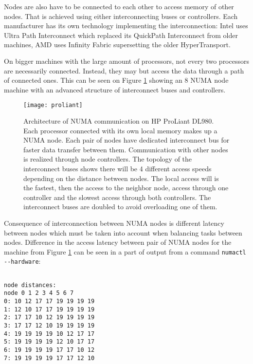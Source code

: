 Nodes are also have to be connected to each other to access memory of other
nodes. That is achieved using either interconnecting buses or controllers. Each
manufacturer has its own technology implementing the interconnection: Intel uses
Ultra Path Interconnect which replaced its QuickPath Interconnect from older
machines, AMD uses Infinity Fabric supersetting the older HyperTransport.

On bigger machines with the large amount of processors, not every two processors
are necessarily connected. Instead, they may but access the data through a path
of connected ones. This can be seen on Figure \ref{fig:proliant} showing an 8
NUMA node machine with an advanced structure of interconnect buses and
controllers.

\begin{figure}
  \centering
  \texttt{[image: proliant]}
  \caption{Architecture of NUMA communication on HP ProLiant DL980. Each
    processor connected with its own local memory makes up a NUMA node. Each
    pair of nodes have dedicated interconnect bus for faster data transfer
    between them. Communication with other nodes is realized through node
    controllers. The topology of the interconnect buses shows there will be 4
    different access speeds depending on the distance between nodes. The local
    access will is the fastest, then the access to the neighbor node, access
    through one controller and the slowest access through both controllers. The
    interconnect buses are doubled to avoid overloading one of them.}
  \label{fig:proliant}
\end{figure}

Consequence of interconnection between NUMA nodes is different latency between
nodes which must be taken into account when balancing tasks between nodes.
Difference in the access latency between pair of NUMA nodes for the machine from
Figure \ref{fig:proliant} can be seen in a part of output from a command
\verb|numactl --hardware|:

\begin{minipage}{\linewidth}
\begin{verbatim}

node distances:
node 0 1 2 3 4 5 6 7
0: 10 12 17 17 19 19 19 19
1: 12 10 17 17 19 19 19 19
2: 17 17 10 12 19 19 19 19
3: 17 17 12 10 19 19 19 19
4: 19 19 19 19 10 12 17 17
5: 19 19 19 19 12 10 17 17
6: 19 19 19 19 17 17 10 12
7: 19 19 19 19 17 17 12 10
\end{verbatim}
\end{minipage}\\

